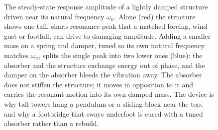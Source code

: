\begin{figure}[htbp]
\centering
{}
\caption[Response of a structure with a tuned mass damper]{The
steady-state response amplitude of a lightly damped structure driven
near its natural frequency $\omega_n$. Alone (red) the structure shows
one tall, sharp resonance peak that a matched forcing, wind gust or
footfall, can drive to damaging amplitude. Adding a smaller mass on a
spring and damper, tuned so its own natural frequency matches
$\omega_n$, splits the single peak into two lower ones (blue): the
absorber and the structure exchange energy out of phase, and the damper
on the absorber bleeds the vibration away. The absorber does not stiffen
the structure; it moves in opposition to it and carries the resonant
motion into its own damped mass. The device is why tall towers hang a
pendulum or a sliding block near the top, and why a footbridge that
sways underfoot is cured with a tuned absorber rather than a rebuild.}
\label{fig:vol03ch04:tmd-response}
\end{figure}
